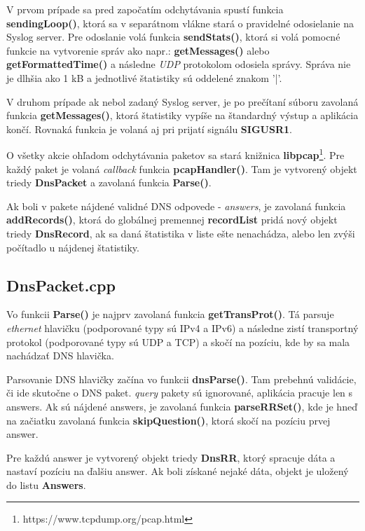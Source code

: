 \documentclass{article}
\begin{document}
        V prvom prípade sa pred započatím odchytávania spustí funkcia \textbf{sendingLoop()},
        ktorá sa v separátnom vlákne stará o pravidelné odosielanie na Syslog server. Pre odoslanie volá funkcia \textbf{sendStats()}, ktorá si volá
        pomocné funkcie na vytvorenie správ ako napr.: \textbf{getMessages()} alebo \textbf{getFormattedTime()} a následne \emph{UDP} protokolom 
        odosiela správy. Správa nie je dlhšia ako 1 kB a jednotlivé štatistiky sú oddelené znakom '|'.

        V druhom prípade ak nebol zadaný Syslog server, je po prečítaní súboru zavolaná funkcia \textbf{getMessages()}, ktorá štatistiky vypíše
        na štandardný výstup a aplikácia končí. Rovnaká funkcia je volaná aj pri prijatí signálu \textbf{SIGUSR1}.

        O všetky akcie ohľadom odchytávania paketov sa stará knižnica \textbf{libpcap}\footnote{https://www.tcpdump.org/pcap.html}. Pre každý paket
        je volaná \emph{callback} funkcia \textbf{pcapHandler()}. Tam je vytvorený objekt triedy \textbf{DnsPacket} a zavolaná funkcia \textbf{Parse()}.

        Ak boli v pakete nájdené validné DNS odpovede - \emph{answers}, je zavolaná funkcia \textbf{addRecords()}, ktorá do globálnej premennej \textbf{recordList} pridá nový
        objekt triedy \textbf{DnsRecord}, ak sa daná štatistika v liste ešte nenachádza, alebo len zvýši počítadlo u nájdenej štatistiky.

        \subsection{DnsPacket.cpp}
        Vo funkcii \textbf{Parse()} je najprv zavolaná funkcia \textbf{getTransProt()}. Tá parsuje \emph{ethernet} hlavičku (podporované typy sú IPv4 a IPv6)
        a následne zistí transportný protokol (podporované typy sú UDP a TCP) a skočí na pozíciu, kde by sa mala nachádzať DNS hlavička.

        Parsovanie DNS hlavičky začína vo funkcii \textbf{dnsParse()}. Tam prebehnú validácie, či ide skutočne o DNS paket. \emph{query} pakety sú
        ignorované, aplikácia pracuje len s answers. Ak sú nájdené answers, je zavolaná funkcia \textbf{parseRRSet()}, kde je hneď na začiatku zavolaná funkcia \textbf{skipQuestion()}, ktorá
        skočí na pozíciu prvej answer.

        Pre každú answer je vytvorený objekt triedy \textbf{DnsRR}, ktorý spracuje dáta a nastaví pozíciu na ďalšiu answer. Ak boli získané nejaké dáta, objekt je uložený do listu
        \textbf{Answers}.
\end{document}
